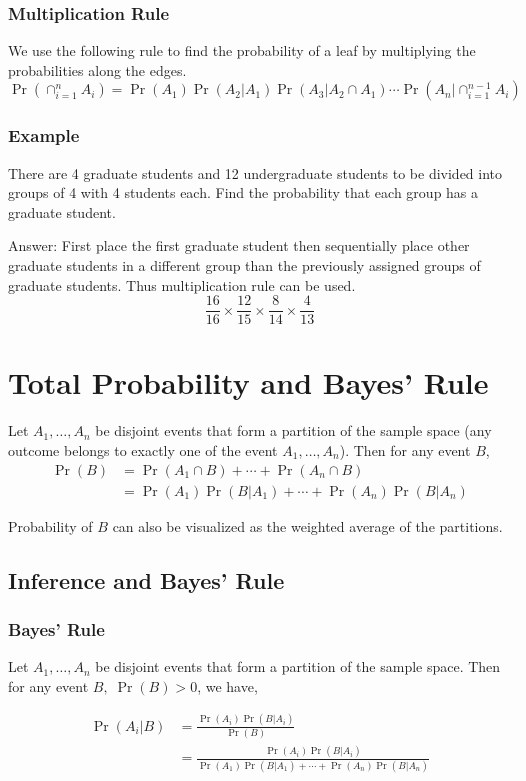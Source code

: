 \subsubsection{Multiplication Rule}
We use the following rule to find the probability of a leaf by multiplying the probabilities along the edges.
\[\boxed{\Pr(\cap_{i=1}^{n}A_i)=\Pr(A_1)\Pr(A_2|A_1)\Pr(A_3|A_2\cap A_1)\cdots \Pr(A_n|\cap_{i=1}^{n-1}A_i)}\]

\subsubsection{Example}
There are 4 graduate students and 12 undergraduate students to be divided into groups of 4 with 4 students each. Find the probability that each group has a graduate student.

Answer: First place the first graduate student then sequentially place other graduate students in a different group than the previously assigned groups of graduate students. Thus multiplication rule can be used.
\[\frac{16}{16} \times \frac{12}{15} \times \frac{8}{14} \times \frac{4}{13} \]

\section{Total Probability and Bayes' Rule}
Let $A_1,\dots,A_n$ be disjoint events that form a partition of the sample space (any outcome belongs to exactly one of the event $A_1,\dots,A_n$). Then for any event $B$,
\begin{align*}
    \Pr(B) &= \Pr(A_1 \cap B) + \cdots + \Pr(A_n \cap B)  \\
     &=  \Pr(A_1)\Pr(B|A_1) + \cdots + \Pr(A_n)\Pr(B|A_n)
\end{align*}

Probability of $B$ can also be visualized as the weighted average of the partitions.

\subsection{Inference and Bayes' Rule}

\subsubsection{Bayes' Rule}
Let $A_1,\dots,A_n$ be disjoint events that form a partition of the sample space. Then for any event $B, \; \Pr(B)>0$, we have,

\begin{align*}
    \Pr(A_i|B) &= \frac{\Pr(A_i)\Pr(B|A_i)}{\Pr(B)} \\
             &= \frac{\Pr(A_i)\Pr(B|A_i)}{\Pr(A_1)\Pr(B|A_1) + \cdots + \Pr(A_n)\Pr(B|A_n)}
\end{align*}


